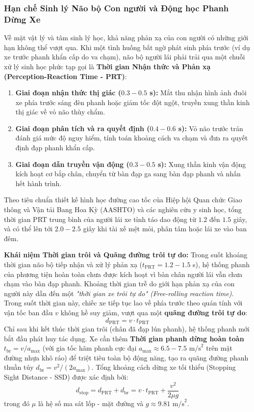\documentclass[a4paper]{article}
\begin{document}
\subsubsection{Hạn chế Sinh lý Não bộ Con người và Động học Phanh Dừng Xe}
Về mặt vật lý và tâm sinh lý học, khả năng phản xạ của con người có những giới hạn không thể vượt qua. Khi một tình huống bất ngờ phát sinh phía trước (ví dụ xe trước phanh khẩn cấp do va chạm), não bộ người lái phải trải qua một chuỗi xử lý sinh học phức tạp gọi là \textbf{Thời gian Nhận thức và Phản xạ (Perception-Reaction Time - PRT)}:
\begin{enumerate}
    \item \textbf{Giai đoạn nhận thức thị giác ($0.3 - 0.5$ s):} Mắt thu nhận hình ảnh đuôi xe phía trước sáng đèn phanh hoặc giảm tốc đột ngột, truyền xung thần kinh thị giác về vỏ não thùy chẩm.
    \item \textbf{Giai đoạn phân tích và ra quyết định ($0.4 - 0.6$ s):} Vỏ não trước trán đánh giá mức độ nguy hiểm, tính toán khoảng cách va chạm và đưa ra quyết định đạp phanh khẩn cấp.
    \item \textbf{Giai đoạn dẫn truyền vận động ($0.3 - 0.5$ s):} Xung thần kinh vận động kích hoạt cơ bắp chân, chuyển từ bàn đạp ga sang bàn đạp phanh và nhấn hết hành trình.
\end{enumerate}
Theo tiêu chuẩn thiết kế hình học đường cao tốc của Hiệp hội Quan chức Giao thông và Vận tải Bang Hoa Kỳ (AASHTO) và các nghiên cứu y sinh học, tổng thời gian PRT trung bình của người lái xe tỉnh táo dao động từ $1.2$ đến $1.5$ giây, và có thể lên tới $2.0 - 2.5$ giây khi tài xế mệt mỏi, phân tâm hoặc lái xe vào ban đêm.

\textbf{Khái niệm Thời gian trôi và Quãng đường trôi tự do:} Trong suốt khoảng thời gian não bộ tiếp nhận và xử lý phản xạ ($t_{\text{PRT}} = 1.2 - 1.5$ s), hệ thống phanh của phương tiện hoàn toàn chưa được kích hoạt vì bàn chân người lái vẫn chưa chạm vào bàn đạp phanh. Khoảng thời gian trễ do giới hạn phản xạ của con người này dẫn đến một \textit{"thời gian xe trôi tự do" (Free-rolling reaction time)}. Trong suốt thời gian này, chiếc xe tiếp tục lao về phía trước theo quán tính với vận tốc ban đầu $v$ không hề suy giảm, vượt qua một \textbf{quãng đường trôi tự do}:
\begin{equation}
    d_{\text{PRT}} = v \cdot t_{\text{PRT}}
\end{equation}
Chỉ sau khi kết thúc thời gian trôi (chân đã đạp lún phanh), hệ thống phanh mới bắt đầu phát huy tác dụng. Xe cần thêm \textbf{Thời gian phanh dừng hoàn toàn} $t_{\text{br}} = v / a_{\text{max}}$ (với gia tốc hãm phanh cực đại $a_{\text{max}} \approx 6.5 - 7.5 \text{ m/s}^2$ trên mặt đường nhựa khô ráo) để triệt tiêu toàn bộ động năng, tạo ra quãng đường phanh thuần túy $d_{\text{br}} = v^2 / (2 a_{\text{max}})$. Tổng khoảng cách dừng xe tối thiểu (Stopping Sight Distance - SSD) được xác định bởi:
\begin{equation}
    d_{\text{stop}} = d_{\text{PRT}} + d_{\text{br}} = v \cdot t_{\text{PRT}} + \frac{v^2}{2 \mu g}
\end{equation}
trong đó $\mu$ là hệ số ma sát lốp - mặt đường và $g \approx 9.81 \text{ m/s}^2$.
\end{document}
